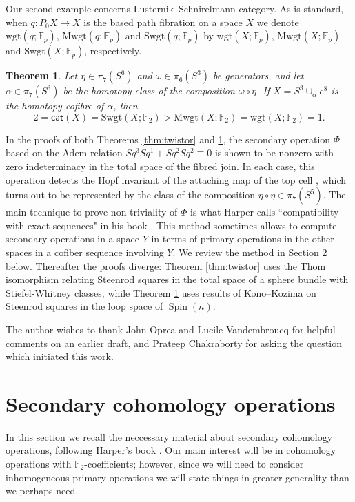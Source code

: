 \documentclass{amsart}
\theoremstyle{plain}
\newtheorem{thm}{Theorem}[section]
\theoremstyle{definition}
\def\cat{\mathsf{cat}}
\def\wgt{\mathrm{wgt}}
\newcommand{\F}{\mathbb{F}}
\def\Mwgt{\mathrm{Mwgt}}
\def\Swgt{\mathrm{Swgt}}
\begin{document}
Our second example concerns Lusternik--Schnirelmann category. As is standard, when $q:P_0 X\to X$ is the based path fibration on a space $X$ we denote $\wgt(q;\F_p)$, $\Mwgt(q;\F_p)$ and $\Swgt(q;\F_p)$ by $\wgt(X;\F_p)$, $\Mwgt(X;\F_p)$ and $\Swgt(X;\F_p)$, respectively.

\begin{thm}\label{thm:2cell}
Let $\eta\in \pi_7(S^6)$ and $\omega\in \pi_6(S^3)$ be generators, and let $\alpha\in\pi_7(S^3)$ be the homotopy class of the composition $\omega\circ\eta$. If $X=S^3\cup_\alpha e^8$ is the homotopy cofibre of $\alpha$, then
\[
2=\cat(X)=\Swgt(X;\F_2)>\Mwgt(X;\F_2)=\wgt(X;\F_2)=1.
\]
\end{thm}

In the proofs of both Theorems \ref{thm:twistor} and \ref{thm:2cell}, the secondary operation $\Phi$ based on the Adem relation $Sq^3Sq^1+Sq^2Sq^2\equiv 0$ is shown to be nonzero with zero indeterminacy in the total space of the fibred join. In each case, this operation detects the Hopf invariant of the attaching map of the top cell \cite{BH,CLOT,GGV}, which turns out to be represented by the class of the composition $\eta\circ\eta\in \pi_7(S^5)$. The main technique to prove non-triviality of $\Phi$ is what Harper calls ``compatibility with exact sequences" in his book \cite{Harper}. This method sometimes allows to compute secondary operations in a space $Y$ in terms of primary operations in the other spaces in a cofiber sequence involving $Y$. We review the method in Section 2 below. Thereafter the proofs diverge: Theorem \ref{thm:twistor} uses the Thom isomorphism relating Steenrod squares in the total space of a sphere bundle with Stiefel-Whitney classes, while Theorem \ref{thm:2cell} uses results of Kono--Kozima \cite{KonoKozima} on Steenrod squares in the loop space of $\operatorname{Spin}(n)$. 

The author wishes to thank John Oprea and Lucile Vandembroucq for helpful comments on an earlier draft, and Prateep Chakraborty for asking the question \cite{Chakra} which initiated this work. 

\section{Secondary cohomology operations}

In this section we recall the neccessary material about secondary cohomology operations, following Harper's book \cite[Chapter 4]{Harper}. Our main interest will be in cohomology operations with $\F_2$-coefficients; however, since we will need to consider inhomogeneous primary operations we will state things in greater generality than we perhaps need. 
\end{document}
